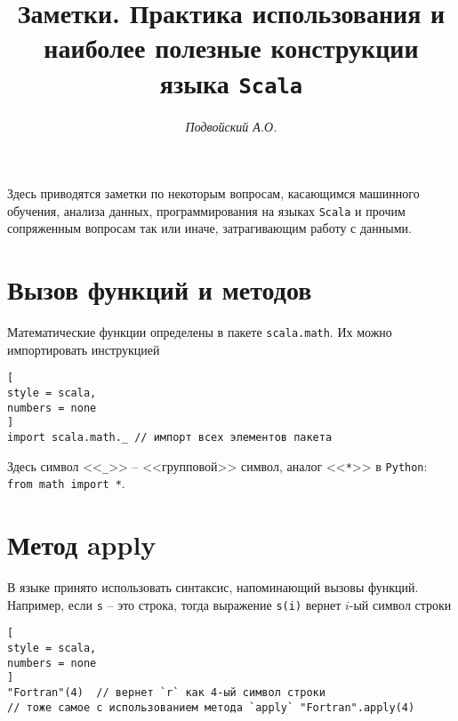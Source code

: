 \documentclass[%
	11pt,
	a4paper,
	utf8,
		]{article}
\begin{document}
\title{Заметки. Практика использования и наиболее полезные конструкции языка \texttt{Scala}}

\author{\itshape Подвойский А.О.}

\date{}
\maketitle

\thispagestyle{fancy}

Здесь приводятся заметки по некоторым вопросам, касающимся машинного обучения, анализа данных, программирования на языках \texttt{Scala} и прочим сопряженным вопросам так или иначе, затрагивающим работу с данными.



\tableofcontents

\section{Вызов функций и методов}

Математические функции определены в пакете \texttt{scala.math}. Их можно импортировать инструкцией

\begin{lstlisting}[
style = scala,
numbers = none
]
import scala.math._ // импорт всех элементов пакета
\end{lstlisting}

Здесь символ <<\verb|_|>> -- <<групповой>> символ, аналог <<\verb|*|>> в \texttt{Python}: \lstinline{from math import *}.


\section{Метод apply}

В языке принято использовать синтаксис, напоминающий вызовы функций. Например, если \texttt{s} -- это строка, тогда выражение \texttt{s(i)} вернет $ i $-ый символ строки
\begin{lstlisting}[
style = scala,
numbers = none
]
"Fortran"(4)  // вернет `r` как 4-ый символ строки
// тоже самое с использованием метода `apply` "Fortran".apply(4)
\end{lstlisting}
\end{document}
